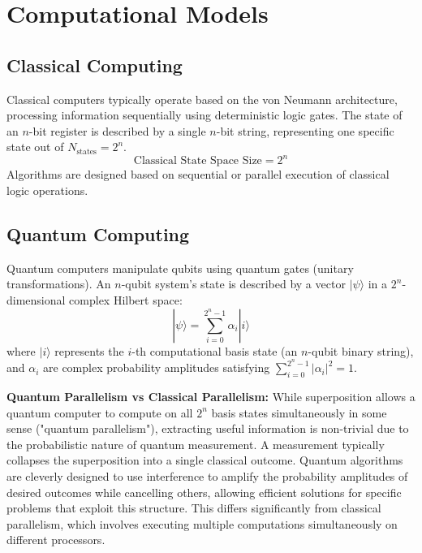 \section{Computational Models}\label{sec:computational_models}

\subsection{Classical Computing}\label{subsec:classical}
Classical computers typically operate based on the von Neumann architecture, processing information sequentially using deterministic logic gates. The state of an $n$-bit register is described by a single $n$-bit string, representing one specific state out of $N_{\text{states}} = 2^n$.
\begin{equation}\label{eq:classical_states_ch4}
    \text{Classical State Space Size} = 2^n
\end{equation}
Algorithms are designed based on sequential or parallel execution of classical logic operations.

\subsection{Quantum Computing}\label{subsec:quantum}
Quantum computers manipulate qubits using quantum gates (unitary transformations). An $n$-qubit system's state is described by a vector $|\psi\rangle$ in a $2^n$-dimensional complex Hilbert space:
\begin{equation}\label{eq:quantum_state_ch4}
    |\psi\rangle = \sum_{i=0}^{2^n-1} \alpha_i|i\rangle
\end{equation}
where $|i\rangle$ represents the $i$-th computational basis state (an $n$-qubit binary string), and $\alpha_i$ are complex probability amplitudes satisfying $\sum_{i=0}^{2^n-1} |\alpha_i|^2 = 1$.

\textbf{Quantum Parallelism vs Classical Parallelism:} While superposition allows a quantum computer to compute on all $2^n$ basis states simultaneously in some sense ("quantum parallelism"), extracting useful information is non-trivial due to the probabilistic nature of quantum measurement. A measurement typically collapses the superposition into a single classical outcome. Quantum algorithms are cleverly designed to use interference to amplify the probability amplitudes of desired outcomes while cancelling others, allowing efficient solutions for specific problems that exploit this structure. This differs significantly from classical parallelism, which involves executing multiple computations simultaneously on different processors.

